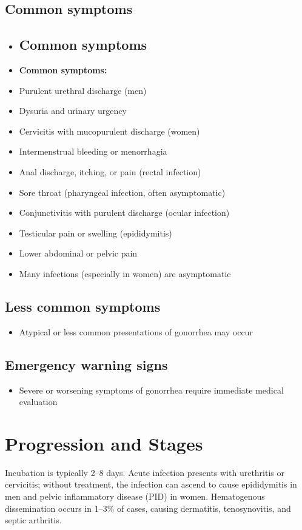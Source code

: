 \subsection{Common symptoms}
\begin{itemize}[noitemsep]
  \item \subsection{Common symptoms}
  \item \textbf{Common symptoms:}
  \item Purulent urethral discharge (men)
  \item Dysuria and urinary urgency
  \item Cervicitis with mucopurulent discharge (women)
  \item Intermenstrual bleeding or menorrhagia
  \item Anal discharge, itching, or pain (rectal infection)
  \item Sore throat (pharyngeal infection, often asymptomatic)
  \item Conjunctivitis with purulent discharge (ocular infection)
  \item Testicular pain or swelling (epididymitis)
  \item Lower abdominal or pelvic pain
  \item Many infections (especially in women) are asymptomatic
\end{itemize}

\subsection{Less common symptoms}
\begin{itemize}[noitemsep]
  \item Atypical or less common presentations of gonorrhea may occur
\end{itemize}

\subsection{Emergency warning signs}
\begin{itemize}[noitemsep]
  \item Severe or worsening symptoms of gonorrhea require immediate medical evaluation
\end{itemize}
\section{Progression and Stages}
Incubation is typically 2--8 days. Acute infection presents with urethritis or cervicitis; without treatment, the infection can ascend to cause epididymitis in men and pelvic inflammatory disease (PID) in women. Hematogenous dissemination occurs in 1--3\% of cases, causing dermatitis, tenosynovitis, and septic arthritis.

